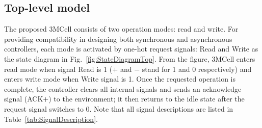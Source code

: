 \documentclass[twocolumn,conference]{IEEEtran}
\begin{document}
\subsection{Top-level model}
\label{subsec:TopLevelModel}
The proposed 3MCell consists of two operation modes: read and write.
For providing compatibility in designing both synchronous and asynchronous controllers, each mode is activated by one-hot request signals: Read and Write as the state diagram in Fig.~\ref{fig:StateDiagramTop}. 
From the figure, 3MCell enters read mode when signal Read is 1 ($+$ and $-$ stand for 1 and 0 respectively) and enters write mode when Write signal is 1. 
Once the requested operation is complete, the controller clears all internal signals and sends an acknowledge signal (ACK$+$) to the environment; it then returns to the idle state after the request signal switches to 0. Note that all signal descriptions are listed in Table~\ref{tab:SignalDescription}.

\end{document}
